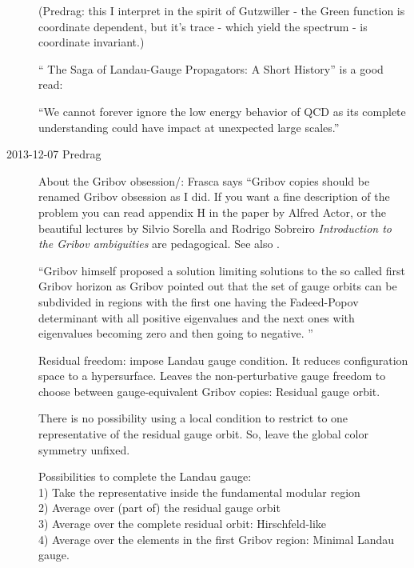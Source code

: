 \begin{description}
(Predrag: this I interpret in the spirit of Gutzwiller - the Green function
is coordinate dependent, but it's trace - which yield the spectrum - is
coordinate invariant.)

``
{The Saga of Landau-Gauge Propagators: A Short History}'' is a good read:

``We cannot forever ignore the low energy behavior of QCD as its complete
understanding could have impact at unexpected large scales.''


\item[2013-12-07  Predrag]
About the
{Gribov obsession/}: Frasca says ``Gribov copies should be renamed Gribov
obsession as I did. If you want a fine description of the problem you can
read appendix H in the paper by Alfred Actor, or the
beautiful lectures by Silvio Sorella and Rodrigo Sobreiro
{\em Introduction to the {Gribov} ambiguities} are pedagogical.
See also
.

``Gribov himself proposed a solution limiting solutions to the so called
first Gribov horizon as Gribov pointed out that the set of gauge orbits
can be subdivided in regions with the first one having the Fadeed-Popov
determinant with all positive eigenvalues and the next ones with
eigenvalues becoming zero and then going to negative. ''

Residual freedom: impose Landau gauge condition. It reduces configuration
space to a hypersurface. Leaves the non-perturbative gauge freedom to
choose between gauge-equivalent Gribov copies: Residual gauge orbit.

There is no possibility using a local condition to restrict to one
representative of the residual gauge orbit. So, leave the global color
symmetry unfixed.

Possibilities to complete the Landau gauge:
\\
1) Take the representative inside the fundamental
modular region
\\
2) Average over (part of) the residual gauge orbit
\\
3) Average over the complete residual orbit: Hirschfeld-like
\\
4)
Average over the elements in the first Gribov region:
Minimal Landau gauge.


\end{description}
